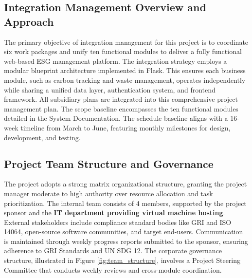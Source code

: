 \documentclass[12pt,a4paper]{article}
\begin{document}
\subsection{Integration Management Overview and Approach}
The primary objective of integration management for this project is to coordinate six work packages and unify ten functional modules to deliver a fully functional web-based ESG management platform. The integration strategy employs a modular blueprint architecture implemented in Flask. This ensures each business module, such as carbon tracking and waste management, operates independently while sharing a unified data layer, authentication system, and frontend framework. All subsidiary plans are integrated into this comprehensive project management plan. The scope baseline encompasses the ten functional modules detailed in the System Documentation. The schedule baseline aligns with a 16-week timeline from March to June, featuring monthly milestones for design, development, and testing.

\subsection{Project Team Structure and Governance}
The project adopts a strong matrix organizational structure, granting the project manager moderate to high authority over resource allocation and task prioritization. The internal team consists of 4 members, supported by the project sponsor and the \textbf{IT department providing virtual machine hosting}. External stakeholders include compliance standard bodies like GRI and ISO 14064, open-source software communities, and target end-users. Communication is maintained through weekly progress reports submitted to the sponsor, ensuring adherence to GRI Standards and UN SDG 12. The corporate governance structure, illustrated in Figure \ref{fig:team_structure}, involves a Project Steering Committee that conducts weekly reviews and cross-module coordination.
\end{document}
